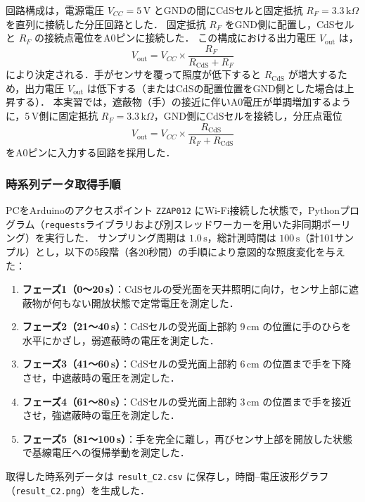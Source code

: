 回路構成は，電源電圧 $V_{CC} = 5\,\mathrm{V}$ とGNDの間にCdSセルと固定抵抗 $R_F = 3.3\,\mathrm{k}\Omega$ を直列に接続した分圧回路とした．
固定抵抗 $R_F$ をGND側に配置し，CdSセルと $R_F$ の接続点電位をA0ピンに接続した．
この構成における出力電圧 $V_{\mathrm{out}}$ は，
\begin{equation}
    V_{\mathrm{out}} = V_{CC} \times \frac{R_F}{R_{\mathrm{CdS}} + R_F}
    \label{eq:cds_divider}
\end{equation}
により決定される．手がセンサを覆って照度が低下すると $R_{\mathrm{CdS}}$ が増大するため，出力電圧 $V_{\mathrm{out}}$ は低下する（またはCdSの配置位置をGND側とした場合は上昇する）．
本実習では，遮蔽物（手）の接近に伴いA0電圧が単調増加するように，5\,V側に固定抵抗 $R_F = 3.3\,\mathrm{k}\Omega$，GND側にCdSセルを接続し，分圧点電位
\begin{equation}
    V_{\mathrm{out}} = V_{CC} \times \frac{R_{\mathrm{CdS}}}{R_F + R_{\mathrm{CdS}}}
    \label{eq:cds_divider_actual}
\end{equation}
をA0ピンに入力する回路を採用した．

\subsubsection{時系列データ取得手順}
PCをArduinoのアクセスポイント \texttt{ZZAP012} にWi-Fi接続した状態で，Pythonプログラム（\texttt{requests}ライブラリおよび別スレッドワーカーを用いた非同期ポーリング）を実行した．
サンプリング周期は $1.0\,\mathrm{s}$，総計測時間は $100\,\mathrm{s}$（計101サンプル）とし，以下の5段階（各20秒間）の手順により意図的な照度変化を与えた：
\begin{enumerate}
    \item \textbf{フェーズ1（0〜20\,s）}：CdSセルの受光面を天井照明に向け，センサ上部に遮蔽物が何もない開放状態で定常電圧を測定した．
    \item \textbf{フェーズ2（21〜40\,s）}：CdSセルの受光面上部約 $9\,\mathrm{cm}$ の位置に手のひらを水平にかざし，弱遮蔽時の電圧を測定した．
    \item \textbf{フェーズ3（41〜60\,s）}：CdSセルの受光面上部約 $6\,\mathrm{cm}$ の位置まで手を下降させ，中遮蔽時の電圧を測定した．
    \item \textbf{フェーズ4（61〜80\,s）}：CdSセルの受光面上部約 $3\,\mathrm{cm}$ の位置まで手を接近させ，強遮蔽時の電圧を測定した．
    \item \textbf{フェーズ5（81〜100\,s）}：手を完全に離し，再びセンサ上部を開放した状態で基線電圧への復帰挙動を測定した．
\end{enumerate}
取得した時系列データは \texttt{result\_C2.csv} に保存し，時間--電圧波形グラフ（\texttt{result\_C2.png}）を生成した．


